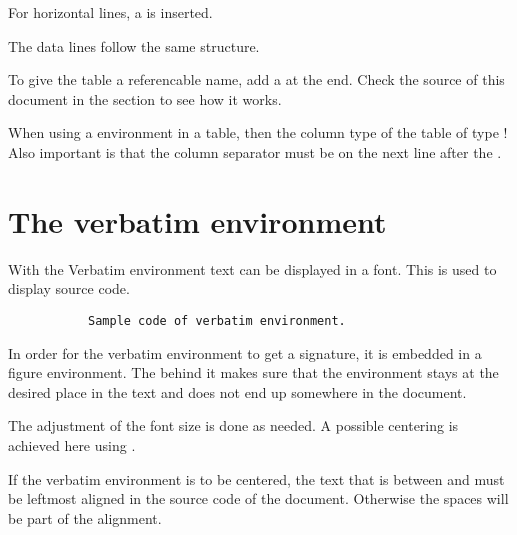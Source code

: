 For horizontal lines, a  is inserted.
\bigbreak

The data lines follow the same structure.
\bigbreak

To give the table a referencable name, add a
 at the end.
Check the source of this document in the section 
to see how it works.
\bigbreak

When using a  environment in a table, then the
column type of the table  of type !
Also important is that the column separator \tsTextMonospace{\&} must be on
the next line after the .

\section{The verbatim environment}

With the Verbatim environment text can be displayed in a
 font. This is used to display source code.

\begin{figure}[H]
    \centering
    \begin{verbbox}
\begin{figure}[H]
    \small
    \centering
    \begin{BVerbatim}
Sample code of verbatim environment.
    \end{BVerbatim}
\end{figure}
    \end{verbbox}
    \theverbbox
\end{figure}

In order for the verbatim environment to get a signature, it is embedded in a
figure environment. The \tsTextMonospace{[H]} behind it makes sure that the
environment stays at the desired place in the text and does not end up
somewhere in the document.
\bigbreak

The adjustment of the font size is done as needed. A possible centering  is
achieved here using .
\bigbreak

 If the verbatim environment is to be centered, the text that
is between  and
 must be leftmost aligned in the
source code of the document. Otherwise the spaces will be part of the
alignment.
\bigbreak

